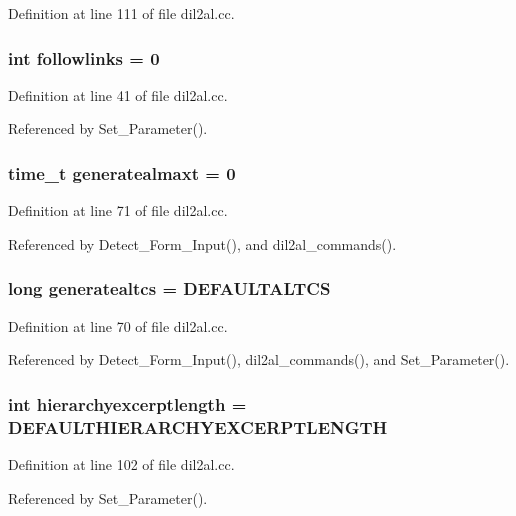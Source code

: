 Definition at line 111 of file dil2al.cc.
\subsubsection{\setlength{\rightskip}{0pt plus 5cm}int followlinks = 0}\label{dil2al_8cc_a15}




Definition at line 41 of file dil2al.cc.

Referenced by Set\_\-Parameter().
\subsubsection{\setlength{\rightskip}{0pt plus 5cm}time\_\-t generatealmaxt = 0}\label{dil2al_8cc_a53}




Definition at line 71 of file dil2al.cc.

Referenced by Detect\_\-Form\_\-Input(), and dil2al\_\-commands().
\subsubsection{\setlength{\rightskip}{0pt plus 5cm}long generatealtcs = DEFAULTALTCS}\label{dil2al_8cc_a52}




Definition at line 70 of file dil2al.cc.

Referenced by Detect\_\-Form\_\-Input(), dil2al\_\-commands(), and Set\_\-Parameter().
\subsubsection{\setlength{\rightskip}{0pt plus 5cm}int hierarchyexcerptlength = DEFAULTHIERARCHYEXCERPTLENGTH}\label{dil2al_8cc_a76}




Definition at line 102 of file dil2al.cc.

Referenced by Set\_\-Parameter().
